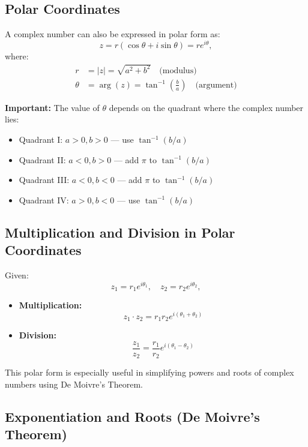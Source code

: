 \subsection*{Polar Coordinates}

A complex number can also be expressed in polar form as:
\[
z = r(\cos \theta + i \sin \theta) = re^{i\theta},
\]
where:
\begin{align*}
r &= |z| = \sqrt{a^2 + b^2} \quad \text{(modulus)} \\
\theta &= \arg(z) = \tan^{-1}\left(\frac{b}{a}\right) \quad \text{(argument)}
\end{align*}

\textbf{Important:} The value of \( \theta \) depends on the quadrant where the complex number lies:
\begin{itemize}
  \item Quadrant I: \( a > 0, b > 0 \) — use \( \tan^{-1}(b/a) \)
  \item Quadrant II: \( a < 0, b > 0 \) — add \( \pi \) to \( \tan^{-1}(b/a) \)
  \item Quadrant III: \( a < 0, b < 0 \) — add \( \pi \) to \( \tan^{-1}(b/a) \)
  \item Quadrant IV: \( a > 0, b < 0 \) — use \( \tan^{-1}(b/a) \)
\end{itemize}

\subsection*{Multiplication and Division in Polar Coordinates}

Given:
\[
z_1 = r_1 e^{i\theta_1}, \quad z_2 = r_2 e^{i\theta_2},
\]

\begin{itemize}
  \item \textbf{Multiplication:}
  \[
  z_1 \cdot z_2 = r_1 r_2 e^{i(\theta_1 + \theta_2)}
  \]

  \item \textbf{Division:}
  \[
  \frac{z_1}{z_2} = \frac{r_1}{r_2} e^{i(\theta_1 - \theta_2)}
  \]
\end{itemize}

This polar form is especially useful in simplifying powers and roots of complex numbers using De Moivre’s Theorem.

\subsection*{Exponentiation and Roots (De Moivre's Theorem)}

